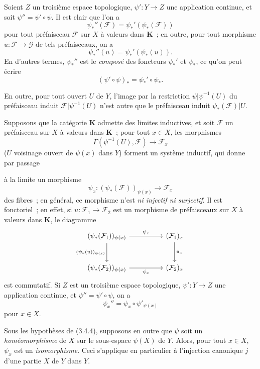 \begin{env}[3.4.3]
\label{0.3.4.3-fr}
Soient $Z$ un troisième espace topologique, $\psi':Y\to Z$ une application
continue, et soit $\psi''=\psi'\circ\psi$. Il est clair que l'on a
\[
  \psi_*''(\mathcal{F})=\psi_*'(\psi_*(\mathcal{F}))
\]
pour tout préfaisceau $\mathcal{F}$ sur $X$ à valeurs dans $\mathbf{K}$~; en
outre, pour tout morphisme $u:\mathcal{F}\to\mathcal{G}$ de tels préfaisceaux,
on a
\[
  \psi_*''(u)=\psi_*'(\psi_*(u)).
\]
En d'autres termes, $\psi_*''$ est le \emph{composé} des foncteurs $\psi_*'$
et $\psi_*$, ce qu'on peut écrire
\[
  (\psi'\circ\psi)_*=\psi_*'\circ\psi_*.
\]

En outre, pour tout ouvert $U$ de $Y$, l'image par la restriction
$\psi|\psi^{-1}(U)$ du préfaisceau induit
$\mathcal{F}|\psi^{-1}(U)$ n'est autre que le préfaisceau induit
$\psi_*(\mathcal{F})|U$.
\end{env}

\begin{env}[3.4.4]
\label{0.3.4.4-fr}
Supposons que la catégorie $\mathbf{K}$ admette des limites inductives, et soit
$\mathcal{F}$ un préfaisceau sur $X$ à valeurs dans $\mathbf{K}$~; pour tout
$x\in X$, les morphismes
\[
  \Gamma(\psi^{-1}(U),\mathcal{F})\to\mathcal{F}_x
\]
($U$ voisinage ouvert de $\psi(x)$ dans $Y$) forment un système inductif, qui
donne par passage


à la limite un morphisme
\[
  \psi_x:(\psi_*(\mathcal{F}))_{\psi(x)}\to\mathcal{F}_x
\]
des fibres~; en général, ce morphisme n'est \emph{ni injectif ni surjectif}.
Il est fonctoriel~; en effet, si
$u:\mathcal{F}_1\to\mathcal{F}_2$ est un morphisme de préfaisceaux sur $X$ à
valeurs dans $\mathbf{K}$, le diagramme
\[
\begin{tikzcd}[column sep=huge,row sep=large]
(\psi_*(\mathcal{F}_1))_{\psi(x)}
  \arrow[r,"\psi_x"] \arrow[d,"{(\psi_*(u))_{\psi(x)}}"']
  & (\mathcal{F}_1)_x \arrow[d,"u_x"] \\
(\psi_*(\mathcal{F}_2))_{\psi(x)}
  \arrow[r,"\psi_x"']
  & (\mathcal{F}_2)_x
\end{tikzcd}
\]
est commutatif. Si $Z$ est un troisième espace topologique,
$\psi':Y\to Z$ une application continue, et $\psi''=\psi'\circ\psi$, on a
\[
  \psi_x''=\psi_x\circ\psi'_{\psi(x)}
\]
pour $x\in X$.
\end{env}

\begin{env}[3.4.5]
\label{0.3.4.5-fr}
Sous les hypothèses de (3.4.4), supposons en outre que $\psi$ soit un
\emph{homéomorphisme} de $X$ sur le sous-espace $\psi(X)$ de $Y$. Alors, pour
tout $x\in X$, $\psi_x$ est un \emph{isomorphisme}. Ceci s'applique en
particulier à l'injection canonique $j$ d'une partie $X$ de $Y$ dans $Y$.
\end{env}

